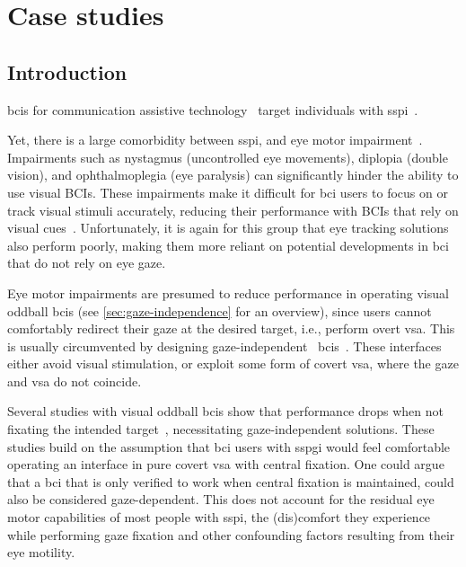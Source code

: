 \chapter{Case studies}
\label{sec:patients}
\section{Introduction}

\Acp{bci} for communication assistive technology~\cite{Millan2010}
target individuals with \ac{sspi}~\cite{Peters2022}.


Yet, there is a large comorbidity between \ac{sspi}, and eye motor impairment~\cite{FriedOken2020}.
Impairments such as nystagmus (uncontrolled eye movements), diplopia (double
vision), and ophthalmoplegia (eye paralysis) can significantly hinder
the ability to use visual BCIs. These impairments make it difficult for
\ac{bci} users to focus on or track visual stimuli accurately, reducing their
performance with BCIs that rely on visual cues~\cite{McCane2014,FriedOken2020,Pasqualotto2015}.
Unfortunately, it is again for this group that eye tracking solutions also
perform poorly, making them more reliant on potential developments in \ac{bci}
that do not rely on eye gaze.

Eye motor impairments are presumed to reduce performance in operating visual
oddball \ac{bci}s (see \autoref{sec:gaze-independence} for an overview), since users
cannot comfortably redirect their gaze at the desired target,
i.e., perform overt \ac{vsa}.
This is usually circumvented by designing gaze-independent~
\acp{bci}~\cite{Riccio2012}.
These interfaces either avoid visual stimulation, or exploit some form of
covert \ac{vsa}, where the gaze and \ac{vsa} do not coincide.

Several studies with visual oddball \acp{bci} show that performance drops when not fixating the intended
target~\cite{Brunner2010, Treder2010, RonAngevin2019}, necessitating
gaze-independent solutions.
These studies build on the assumption that \ac{bci} users with \ac{sspgi}
would feel comfortable operating an interface in pure covert \ac{vsa} with
central fixation.
One could argue that a \ac{bci} that is only verified to work when central
fixation is maintained, could also be considered gaze-dependent.
This does not account for the residual eye motor capabilities of most people
with \ac{sspi}, the (dis)comfort they experience while
performing gaze fixation and other confounding factors resulting from their eye
motility.

